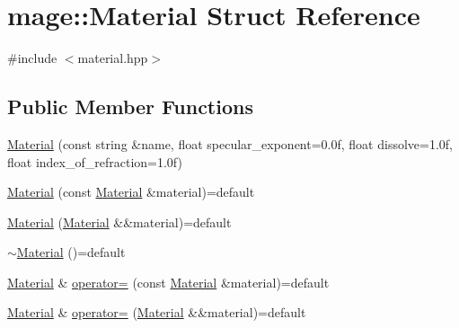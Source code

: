 \hypertarget{structmage_1_1_material}{}\section{mage\+:\+:Material Struct Reference}
\label{structmage_1_1_material}


{\ttfamily \#include $<$material.\+hpp$>$}

\subsection*{Public Member Functions}
\begin{DoxyCompactItemize}
\item 
\hyperlink{structmage_1_1_material_ace4a06c8c8c4e75d82e701443f88d1d3}{Material} (const string \&name, float specular\+\_\+exponent=0.\+0f, float dissolve=1.\+0f, float index\+\_\+of\+\_\+refraction=1.\+0f)
\item 
\hyperlink{structmage_1_1_material_abed630412cdc4a6281389d128ec4b5f3}{Material} (const \hyperlink{structmage_1_1_material}{Material} \&material)=default
\item 
\hyperlink{structmage_1_1_material_a41bfbc2bfa16e3694ac443d390b804c2}{Material} (\hyperlink{structmage_1_1_material}{Material} \&\&material)=default
\item 
\hyperlink{structmage_1_1_material_a4ca65b7e24144ee08dd1ce8d0eda9284}{$\sim$\+Material} ()=default
\item 
\hyperlink{structmage_1_1_material}{Material} \& \hyperlink{structmage_1_1_material_a7ebc9986924ca13ae8468005518dcfc7}{operator=} (const \hyperlink{structmage_1_1_material}{Material} \&material)=default
\item 
\hyperlink{structmage_1_1_material}{Material} \& \hyperlink{structmage_1_1_material_a500a2ebe99d4d7b3be5bf57b6bff62a1}{operator=} (\hyperlink{structmage_1_1_material}{Material} \&\&material)=default
\end{DoxyCompactItemize}
